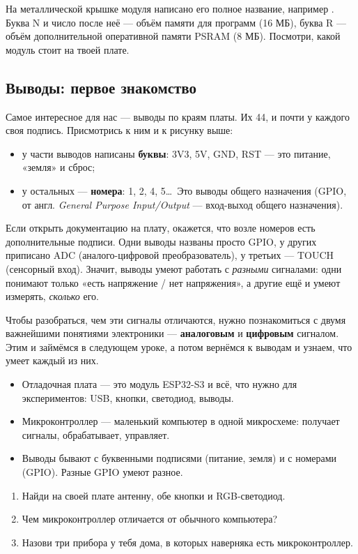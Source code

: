 \begin{fact}
На металлической крышке модуля написано его полное название, например .
Буква N и число после неё --- объём памяти для программ (16 МБ), буква R --- объём дополнительной
оперативной памяти PSRAM (8 МБ). Посмотри, какой модуль стоит на твоей плате.
\end{fact}

\subsection{Выводы: первое знакомство}

Самое интересное для нас --- выводы по краям платы. Их 44, и почти у каждого своя подпись.
Присмотрись к ним и к рисунку выше:

\begin{itemize}
  \item у части выводов написаны \textbf{буквы}: \textsf{3V3}, \textsf{5V}, \textsf{GND}, \textsf{RST} --- это
        питание, «земля» и сброс;
  \item у остальных --- \textbf{номера}: 1, 2, 4, 5\ldots\ Это выводы общего назначения (GPIO, от англ.
        \emph{General Purpose Input/Output} --- вход-выход общего назначения).
\end{itemize}

Если открыть документацию на плату, окажется, что возле номеров есть дополнительные подписи.
Одни выводы названы просто GPIO, у других приписано ADC (аналого-цифровой преобразователь), у третьих ---
TOUCH (сенсорный вход). Значит, выводы умеют работать с \emph{разными} сигналами: одни понимают
только «есть напряжение / нет напряжения», а другие ещё и умеют измерять, \emph{сколько} его.

Чтобы разобраться, чем эти сигналы отличаются, нужно познакомиться с двумя важнейшими понятиями
электроники --- \textbf{аналоговым} и \textbf{цифровым} сигналом. Этим и займёмся в следующем уроке, а
потом вернёмся к выводам и узнаем, что умеет каждый из них.

\begin{summary}
\begin{itemize}[leftmargin=*]
  \item Отладочная плата --- это модуль ESP32-S3 и всё, что нужно для экспериментов: USB, кнопки, светодиод, выводы.
  \item Микроконтроллер --- маленький компьютер в одной микросхеме: получает сигналы, обрабатывает, управляет.
  \item Выводы бывают с буквенными подписями (питание, земля) и с номерами (GPIO). Разные GPIO умеют разное.
\end{itemize}
\end{summary}

\begin{quiz}
\begin{enumerate}
  \item Найди на своей плате антенну, обе кнопки и RGB-светодиод.
  \item Чем микроконтроллер отличается от обычного компьютера?
  \item Назови три прибора у тебя дома, в которых наверняка есть микроконтроллер.
\end{enumerate}
\end{quiz}
